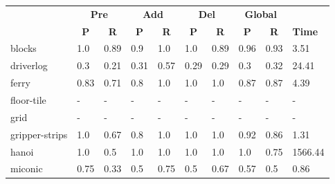 \begin{table}[hbt!]
	\begin{center}
		\begin{footnotesize}
		\begin{tabular}{l|l|l|l|l|l|l||l|l||l|}
			& \multicolumn{2}{|c|}{\bf Pre} & \multicolumn{2}{|c|}{\bf Add} & \multicolumn{2}{|c||}{\bf Del} & \multicolumn{2}{|c|}{\bf Global} & \\ \cline{2-9}			
			& \multicolumn{1}{|c|}{\bf P} & \multicolumn{1}{|c|}{\bf R} & \multicolumn{1}{|c|}{\bf P} & \multicolumn{1}{|c|}{\bf R} & \multicolumn{1}{|c|}{\bf P} & \multicolumn{1}{|c||}{\bf R} &  \multicolumn{1}{|c|}{\bf P} & \multicolumn{1}{|c|}{\bf R} & {\bf Time} \\
			\hline
			blocks & 1.0 & 0.89 & 0.9 & 1.0 & 1.0 & 0.89 & 0.96 & 0.93& 3.51 \\ %
			driverlog & 0.3 & 0.21 & 0.31 & 0.57 & 0.29 & 0.29 & 0.3 & 0.32& 24.41 \\ %
			ferry & 0.83 & 0.71 & 0.8 & 1.0 & 1.0 & 1.0 & 0.87 & 0.87& 4.39 \\ %
			floor-tile & - & - & - & - & - & - & - & - & - \\ %
			grid & - & - & - & - & - & - & - & - & - \\ %
			gripper-strips & 1.0 & 0.67 & 0.8 & 1.0 & 1.0 & 1.0 & 0.92 & 0.86& 1.31 \\ %
			hanoi & 1.0 & 0.5 & 1.0 & 1.0 & 1.0 & 1.0 & 1.0 & 0.75& 1566.44 \\ %
			miconic & 0.75 & 0.33 & 0.5 & 0.75 & 0.5 & 0.67 & 0.57 & 0.5& 0.86 \\ %

\end{tabular}
\end{footnotesize}
\end{center}
\end{table}
